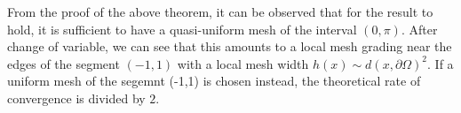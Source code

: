 \documentclass[10pt,a4paper]{article}
\begin{document}
\begin{Rem} From the proof of the above theorem, it can  be observed that for the result to hold, it is sufficient to have a quasi-uniform mesh of the interval $(0,\pi)$. After change of variable, we can see that this amounts to a local mesh grading near the edges of the segment $(-1,1)$ with a local mesh width $h(x) \sim d(x,\partial \Omega)^2$. If a uniform mesh of the segemnt (-1,1) is chosen instead, the theoretical rate of convergence is divided by $2$.  
\end{Rem}



	
	
\end{document}
